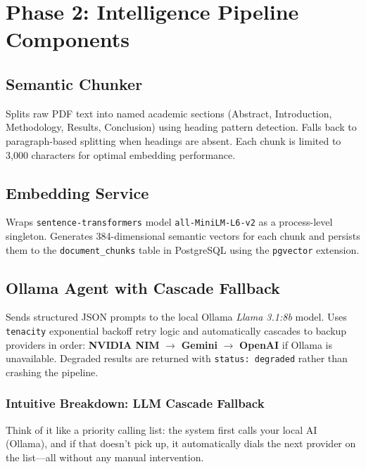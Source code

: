 \documentclass[11pt,a4paper]{article}
\begin{document}
\newpage

\section{Phase 2: Intelligence Pipeline Components}

\subsection*{Semantic Chunker}
Splits raw PDF text into named academic sections (Abstract, Introduction, Methodology, Results, Conclusion) using heading pattern detection. Falls back to paragraph-based splitting when headings are absent. Each chunk is limited to 3{,}000 characters for optimal embedding performance.

\subsection*{Embedding Service}
Wraps \texttt{sentence-transformers} model \texttt{all-MiniLM-L6-v2} as a process-level singleton. Generates 384-dimensional semantic vectors for each chunk and persists them to the \texttt{document\_chunks} table in PostgreSQL using the \texttt{pgvector} extension.

\subsection*{Ollama Agent with Cascade Fallback}
Sends structured JSON prompts to the local Ollama \textit{Llama 3.1:8b} model. Uses \texttt{tenacity} exponential backoff retry logic and automatically cascades to backup providers in order: \textbf{NVIDIA NIM} $\rightarrow$ \textbf{Gemini} $\rightarrow$ \textbf{OpenAI} if Ollama is unavailable. Degraded results are returned with \texttt{status: degraded} rather than crashing the pipeline.

\subsubsection*{Intuitive Breakdown: LLM Cascade Fallback}
Think of it like a priority calling list: the system first calls your local AI (Ollama), and if that doesn't pick up, it automatically dials the next provider on the list---all without any manual intervention.
\end{document}
